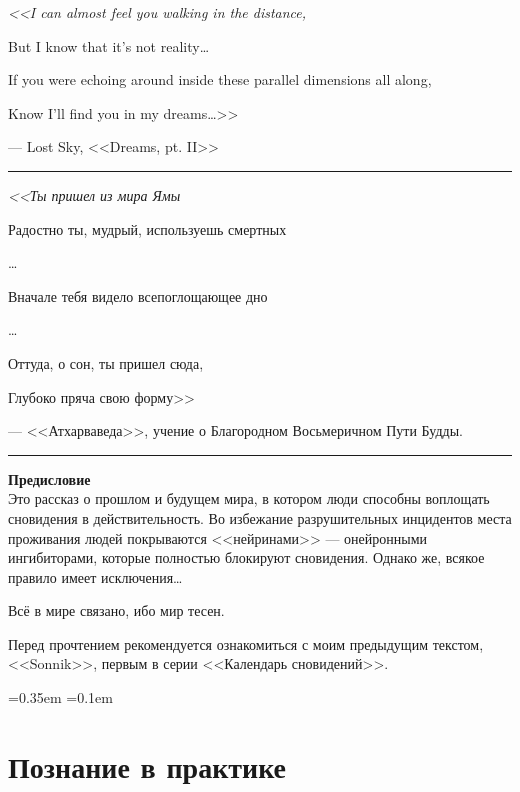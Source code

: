 \documentclass[openany, oneside]{book}
\newcommand{\vf}{\vspace{5mm}}
\begin{document}
\begin{flushleft}
{\it
<<I can almost feel you walking in the distance,

But I know that it's not reality\dots

If you were echoing around inside these parallel dimensions all along,

Know I'll find you in my dreams\dots>>
}

\vf

--- Lost Sky, <<Dreams, pt. II>>

\vf
\vf

\rule{\textwidth}{.7pt}

\vf
\vf

{\it <<Ты пришел из мира Ямы

Радостно ты, мудрый, используешь смертных

\dots

Вначале тебя видело всепоглощающее дно

\dots

Оттуда, о сон, ты пришел сюда,

Глубоко пряча свою форму>>}

\vf

--- <<Атхарваведа>>, учение о Благородном Восьмеричном Пути Будды.

\vf
\vf

\rule{\textwidth}{.7pt}

\vf
\vf

\textbf{Предисловие}\\


Это рассказ о прошлом и будущем мира, в котором люди способны воплощать сновидения в действительность. Во избежание разрушительных инцидентов места проживания людей покрываются <<нейринами>> --- онейронными ингибиторами, которые полностью блокируют сновидения. Однако же, всякое правило имеет исключения\dots \

Всё в мире связано, ибо мир тесен.

Перед прочтением рекомендуется ознакомиться с моим предыдущим текстом, <<Sonnik>>, первым в серии <<Календарь сновидений>>.

\end{flushleft}

\font=0.35em
\font=0.1em

\chapter{Познание в практике}
\end{document}
